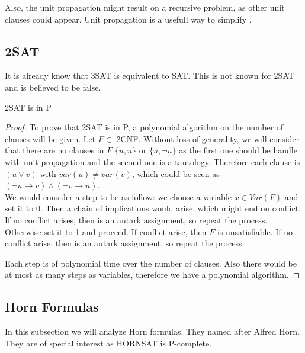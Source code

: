Also, the unit propagation might result on a recursive problem, as other unit clauses could appear. Unit propagation is a usefull way to simplify . \\ 






\subsection{2SAT}
It is already know that 3SAT is equivalent to SAT. This is not known for 2SAT and is believed to be false.

\begin{proposition}
  2SAT is in P 
\end{proposition}
\begin{proof}

  To prove that 2SAT is in P, a polynomial algorithm on the number of clauses will be given. Let $F \in$ 2CNF.  Without loss of generality, we will consider that there are no clauses in $F$ $\{u,u\}$ or $\{u,\neg u\}$ as the first one should be handle with unit propagation and the second one is a tautology. Therefore each clause is $(u \vee v)$ with $var(u) \ne var(v)$, which could be seen as $(\neg u \rightarrow v) \wedge (\neg v \rightarrow u)$.\\


  
  We would consider a step to be as follow: we choose a variable $x \in Var(F)$ and set it to 0. Then a chain of implications would arise, which might end on conflict. If no conflict arises, then is an autark assignment, so repeat the process. Otherwise set it to 1 and proceed. If conflict arise, then $F$ is unsatisfiable. If no conflict arise, then is an autark assignment, so repeat the process.
  

  Each step is of polynomial time over the number of clauses. Also there would be at most as many steps as variables, therefore we have a polynomial algorithm.
  
 
\end{proof}

\subsection{Horn Formulas}

\label{sub:Horn}

In this subsection we will analyze Horn formulas. They named after Alfred Horn\cite{horn1951sentences}. They are of special interest as HORNSAT is P-complete.


